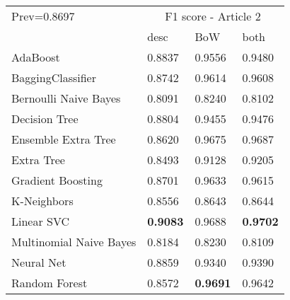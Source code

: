 \begin{tabular}{|l|l|l|l| }
\hline
Prev=0.8697 &  \multicolumn{3}{c|}{F1 score - Article 2} \\
\cline{2-4} & desc & BoW & both \\ \hline
AdaBoost                & 0.8837 & 0.9556 & 0.9480\\
BaggingClassifier       & 0.8742 & 0.9614 & 0.9608\\
Bernoulli Naive Bayes   & 0.8091 & 0.8240 & 0.8102\\
Decision Tree           & 0.8804 & 0.9455 & 0.9476\\
Ensemble Extra Tree     & 0.8620 & 0.9675 & 0.9687\\
Extra Tree              & 0.8493 & 0.9128 & 0.9205\\
Gradient Boosting       & 0.8701 & 0.9633 & 0.9615\\
K-Neighbors             & 0.8556 & 0.8643 & 0.8644\\
Linear SVC              & {\bf 0.9083} & 0.9688 & {\bf 0.9702}\\
Multinomial Naive Bayes & 0.8184 & 0.8230 & 0.8109\\
Neural Net              & 0.8859 & 0.9340 & 0.9390\\
Random Forest           & 0.8572 & {\bf 0.9691} & 0.9642\\
\hline
\end{tabular}